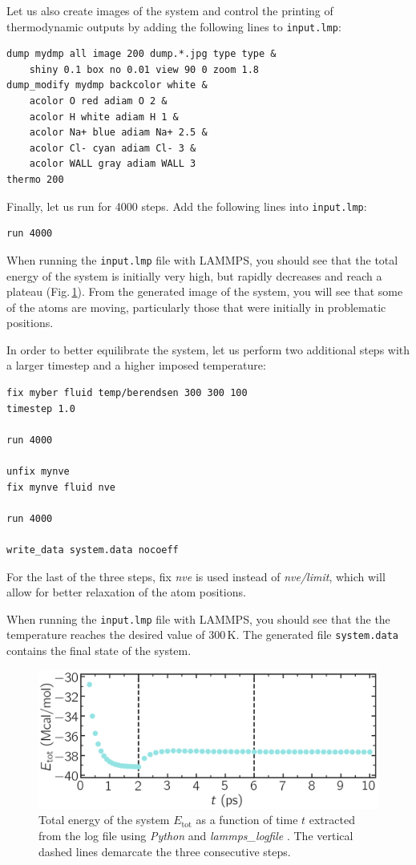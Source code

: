 \documentclass[9pt,tutorial]{livecoms}
\newcommand{\flecmd}[1]{\textcolor{command}{\texttt{#1}}} %
\begin{document}
Let us also create images of the system and control
the printing of thermodynamic outputs by adding the following lines to \flecmd{input.lmp}:
\begin{lstlisting}
dump mydmp all image 200 dump.*.jpg type type &
    shiny 0.1 box no 0.01 view 90 0 zoom 1.8
dump_modify mydmp backcolor white &
    acolor O red adiam O 2 &
    acolor H white adiam H 1 &
    acolor Na+ blue adiam Na+ 2.5 &
    acolor Cl- cyan adiam Cl- 3 &
    acolor WALL gray adiam WALL 3
thermo 200
\end{lstlisting}
Finally, let us run for 4000 steps. Add the following lines into \flecmd{input.lmp}:
\begin{lstlisting}
run 4000
\end{lstlisting}
When running the \flecmd{input.lmp} file with LAMMPS, you should see that the
total energy of the system is initially very high, but rapidly decreases and
reach a plateau (Fig.\,\ref{fig:NANOSHEAR-minimization}). From the generated image of the system,
you will see that some of the atoms are moving, particularly those that were
initially in problematic positions.

In order to better equilibrate the system, let us perform two additional steps
with a larger timestep and a higher imposed temperature:
\begin{lstlisting}
fix myber fluid temp/berendsen 300 300 100
timestep 1.0

run 4000

unfix mynve
fix mynve fluid nve

run 4000

write_data system.data nocoeff
\end{lstlisting}
For the last of the three steps, fix \textit{nve} is used instead of
\textit{nve/limit}, which will allow for better relaxation of the atom positions.

When running the \flecmd{input.lmp} file with LAMMPS, you should see that the
the temperature reaches the desired value of $300\,\text{K}$. The generated file
\flecmd{system.data} contains the final state of the system.

\begin{figure}
\centering
\includegraphics[width=\linewidth]{NANOSHEAR-minimization}
\caption{Total energy of the system $E_\text{tot}$ as a function of time $t$
extracted from the log file using \textit{Python} and \textit{lammps\_logfile}
\cite{sveinsson2021logfile}. The vertical dashed lines demarcate the three
consecutive steps.}
\label{fig:NANOSHEAR-minimization}
\end{figure}
\end{document}
